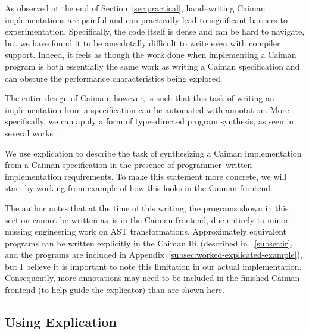 As observed at the end of Section~\ref{sec:practical}, hand--writing Caiman implementations are painful and can practically lead to significant barriers to experimentation.  Specifically, the code itself is dense and can be hard to navigate, but we have found it to be anecdotally difficult to write even with compiler support.  Indeed, it feels as though the work done when implementing a Caiman program is both essentially the same work as writing a Caiman specification and can obscure the performance characteristics being explored.

The entire design of Caiman, however, is such that this task of writing an implementation from a specification can be automated with annotation.  More specifically, we can apply a form of type--directed program synthesis, as seen in several works .

We use explication to describe the task of synthesizing a Caiman implementation from a Caiman specification in the presence of programmer--written implementation requirements.  To make this statement more concrete, we will start by working from example of how this looks in the Caiman frontend.

The author notes that at the time of this writing, the programs shown in this section cannot be written as--is in the Caiman frontend, due entirely to minor missing engineering work on AST transformations.  Approximately equivalent programs can be written explicitly in the Caiman IR (described in ~\ref{subsec:ir}, and the programs are included in Appendix~\ref{subsec:worked-explicated-example}), but I believe it is important to note this limitation in our actual implementation.  Consequently, more annotations may need to be included in the finished Caiman frontend (to help guide the explicator) than are shown here.

\subsection{Using Explication}

